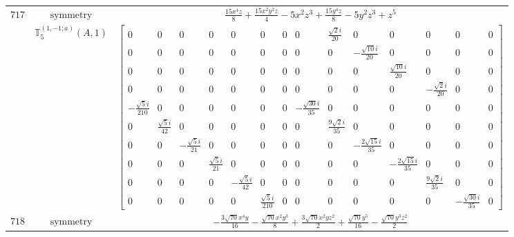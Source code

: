 \documentclass[fleqn,8pt,landscape]{jsarticle}
\begin{document}
\begin{longtable}{ccc}
$ 717 $ & $ \text{symmetry} $ & $ \frac{15 x^{4} z}{8} + \frac{15 x^{2} y^{2} z}{4} - 5 x^{2} z^{3} + \frac{15 y^{4} z}{8} - 5 y^{2} z^{3} + z^{5} $ \\
$  $ & $ \mathbb{T}_{5}^{(1,-1;a)}(A,1) $ & $ \begin{bmatrix} 0 & 0 & 0 & 0 & 0 & 0 & 0 & 0 & \frac{\sqrt{2} i}{20} & 0 & 0 & 0 & 0 & 0 \\ 0 & 0 & 0 & 0 & 0 & 0 & 0 & 0 & 0 & - \frac{\sqrt{10} i}{20} & 0 & 0 & 0 & 0 \\ 0 & 0 & 0 & 0 & 0 & 0 & 0 & 0 & 0 & 0 & \frac{\sqrt{10} i}{20} & 0 & 0 & 0 \\ 0 & 0 & 0 & 0 & 0 & 0 & 0 & 0 & 0 & 0 & 0 & - \frac{\sqrt{2} i}{20} & 0 & 0 \\ - \frac{\sqrt{5} i}{210} & 0 & 0 & 0 & 0 & 0 & 0 & - \frac{\sqrt{30} i}{35} & 0 & 0 & 0 & 0 & 0 & 0 \\ 0 & \frac{\sqrt{5} i}{42} & 0 & 0 & 0 & 0 & 0 & 0 & \frac{9 \sqrt{2} i}{35} & 0 & 0 & 0 & 0 & 0 \\ 0 & 0 & - \frac{\sqrt{5} i}{21} & 0 & 0 & 0 & 0 & 0 & 0 & - \frac{2 \sqrt{15} i}{35} & 0 & 0 & 0 & 0 \\ 0 & 0 & 0 & \frac{\sqrt{5} i}{21} & 0 & 0 & 0 & 0 & 0 & 0 & - \frac{2 \sqrt{15} i}{35} & 0 & 0 & 0 \\ 0 & 0 & 0 & 0 & - \frac{\sqrt{5} i}{42} & 0 & 0 & 0 & 0 & 0 & 0 & \frac{9 \sqrt{2} i}{35} & 0 & 0 \\ 0 & 0 & 0 & 0 & 0 & \frac{\sqrt{5} i}{210} & 0 & 0 & 0 & 0 & 0 & 0 & - \frac{\sqrt{30} i}{35} & 0 \end{bmatrix} $ \\ \hline
$ 718 $ & $ \text{symmetry} $ & $ - \frac{3 \sqrt{70} x^{4} y}{16} - \frac{\sqrt{70} x^{2} y^{3}}{8} + \frac{3 \sqrt{70} x^{2} y z^{2}}{2} + \frac{\sqrt{70} y^{5}}{16} - \frac{\sqrt{70} y^{3} z^{2}}{2} $ \\

\end{longtable}
\end{document}
